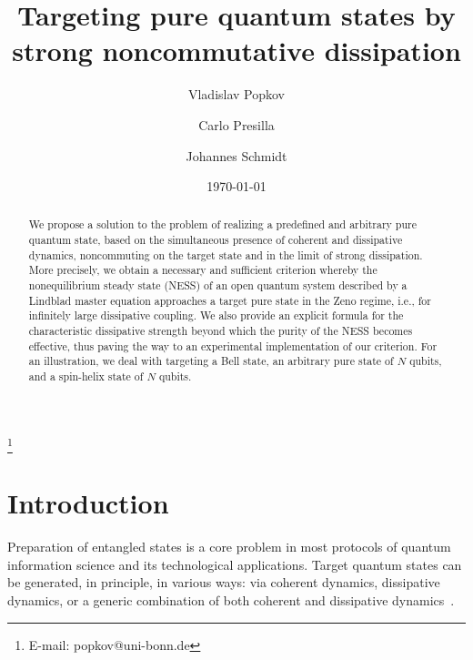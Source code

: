 \documentclass[aps,pra,letterpaper,twocolumn,showpacs,superscriptaddress,floatfix,longbibliography]{revtex4-1}
\begin{document}
\title{Targeting pure quantum states by strong noncommutative
  dissipation}


\author{Vladislav Popkov} \thanks{E-mail: popkov@uni-bonn.de}
   \author{Carlo Presilla}
 
\author{Johannes Schmidt} 


\begin{abstract}
  We propose a solution to the problem of realizing a predefined and
  arbitrary pure quantum state, based on the simultaneous presence of
  coherent and dissipative dynamics, noncommuting on the target state
  and in the limit of strong dissipation.  More precisely, we obtain a
  necessary and sufficient criterion whereby the nonequilibrium steady
  state (NESS) of an open quantum system described by a Lindblad
  master equation approaches a target pure state in the Zeno regime,
  i.e., for infinitely large dissipative coupling.  We also provide an
  explicit formula for the characteristic dissipative strength beyond
  which the purity of the NESS becomes effective, thus paving the way
  to an experimental implementation of our criterion. For an
  illustration, we deal with targeting a Bell state, an arbitrary pure
  state of $N$ qubits, and a spin-helix state of $N$ qubits.
\end{abstract}


\date{\today }
\maketitle

\section{Introduction} Preparation of entangled states is a core
problem in most protocols of quantum information science and its
technological applications.  Target quantum states can be generated,
in principle, in various ways: via coherent dynamics, dissipative
dynamics, or a generic combination of both coherent and dissipative
dynamics~\cite{ShankarNature2013Bell,LinNature2013Bell,
  BlattPhysReports08,BlattNature2013,Kienzler2015Science,
  Kastoryano2011PRL,TicozziViola2012,PhysRevA.87.033802,
  PhysRevLett.107.080503,Diehl2011,PhysRevLett.106.020504,
  PhysRevLett.110.120402,PhysRevLett.110.253601,PhysRevLett.117.040501,
  1367-2630-14-6-063014,1367-2630-14-5-053022,
  PhysRevLett.111.246802,PhysRevA.88.023849,Barreiro2011}.
\end{document}
